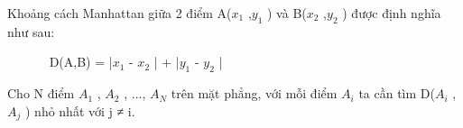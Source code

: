 Khoảng cách Manhattan giữa 2 điểm A($x_{1}$ ,$y_{1}$ ) và B($x_{2}$ ,$y_{2}$ ) được định nghĩa như sau:

        D(A,B) = |$x_{1}$ - $x_{2}$ | + |$y_{1}$ - $y_{2}$ |

Cho N điểm $A_{1}$ , $A_{2}$ , ..., $A_{N}$ trên mặt phẳng, với mỗi điểm $A_{i}$ ta cần tìm D($A_{i}$ , $A_{j}$ ) nhỏ nhất với j ≠ i.